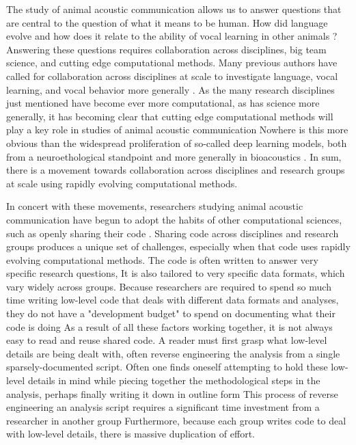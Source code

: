 \documentclass[11pt]{article}
\begin{document}
The study of animal acoustic communication allows us to answer questions that are central to the question of what it means to be human. How did language evolve and how does it relate to the ability of vocal learning in other animals  \cite{hauserFacultyLanguageWhat2002, wirthlinModularApproachVocal2019,  vernesMultidimensionalNatureVocal2021petkovBirdsPrimatesSpoken2012, martinsVocalLearningContinuum2020}?
Answering these questions requires collaboration across disciplines, big team science, and cutting edge computational methods.
Many previous authors have called for collaboration across disciplines at scale to investigate language, vocal learning, and vocal behavior more generally 
\cite{hauserFacultyLanguageWhat2002, wirthlinModularApproachVocal2019, berthetAnimalLinguisticsPrimer2022}.
As the many research disciplines just mentioned have become ever more computational, as has science more generally, it has becoming clear that cutting edge computational methods will play a key role in studies of animal acoustic communication
Nowhere is this more obvious than the widespread proliferation of so-called deep learning models, both from a neuroethological standpoint \cite{sainburgComputationalNeuroethologyVocal2021} and more generally in bioacoustics \cite{stowellComputationalBioacousticsDeep2022}.
In sum, there is a movement towards collaboration across disciplines and research groups at scale using rapidly evolving computational methods.

In concert with these movements, researchers studying animal acoustic communication have begun to adopt the habits of other computational sciences, such as openly sharing their code \cite{christinaBuffetApproachOpen2023}.
Sharing code across disciplines and research groups produces a unique set of challenges, especially when that code uses rapidly evolving computational methods.
The code is often written to answer very specific research questions,
It is also tailored to very specific data formats, which vary widely across groups. 
Because researchers are required to spend so much time writing low-level code that deals with different data formats and analyses, they do not have a "development budget" to spend on documenting what their code is doing
As a result of all these factors working together, it is not always easy to read and reuse shared code. A reader must first grasp what low-level details are being dealt with, often reverse engineering the analysis from a single sparsely-documented script. Often one finds oneself attempting to hold these low-level details in mind while piecing together the methodological steps in the analysis, perhaps finally writing it down in outline form
This process of reverse engineering an analysis script requires a significant time investment from a researcher in another group
Furthermore, because each group writes code to deal with low-level details, there is massive duplication of effort. 
\end{document}
